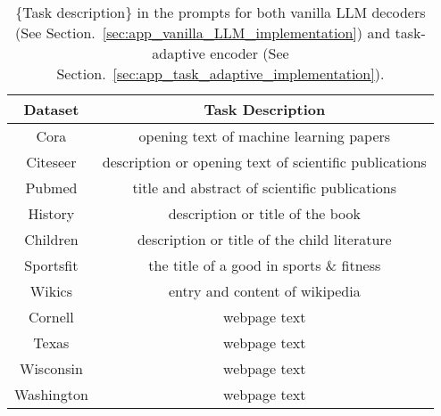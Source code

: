 \begin{table}[h]
\small
\centering
\begin{tabular}{@{}cc@{}}
\toprule
Dataset & Task Description \\ \midrule
Cora & opening text of machine learning papers \\
Citeseer & description or opening text of scientific publications \\
Pubmed & title and abstract of scientific publications \\
History & description or title of the book \\
Children & description or title of the child literature \\
Sportsfit & the title of a good in sports \& fitness \\
Wikics & entry and content of wikipedia \\
Cornell & webpage text \\
Texas & webpage text \\
Wisconsin & webpage text \\
Washington & webpage text \\ \bottomrule
\end{tabular}
\caption{\{Task description\} in the prompts for both vanilla LLM decoders (See Section.~\ref{sec:app_vanilla_LLM_implementation}) and task-adaptive encoder (See Section.~\ref{sec:app_task_adaptive_implementation}).}
\label{tab:vanilla_llm_task_description}
\end{table}